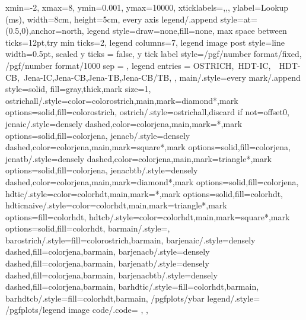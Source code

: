 {{      xmin=-2,
      xmax=8,
      ymin=0.001,
      ymax=10000,
      xticklabels={,,},
      ylabel={Lookup (ms)},
      width=8cm,
      height=5cm,
      every axis legend/.append style={at={(0.5,0)},anchor=north},
      legend style={draw=none,fill=none},
      max space between ticks=12pt,try min ticks=2,
      legend columns=7,
      legend image post style={line width=0.5pt},
      scaled y ticks = false,
      y tick label style={/pgf/number format/fixed, /pgf/number format/1000 sep = \thinspace},
      legend entries = {OSTRICH,\ HDT-IC,\ \ HDT-CB,\ Jena-IC,Jena-CB,Jena-TB,Jena-CB/TB,}
  },
  main/.style={every mark/.append style={solid, fill=gray},thick,mark size=1},
  ostrichall/.style={color=colorostrich,main,mark=diamond*,mark options={solid,fill=colorostrich}},
  ostrich/.style={ostrichall,discard if not={offset}{0}},
  jenaic/.style={densely dashed,color=colorjena,main,mark=*,mark options={solid,fill=colorjena}},
  jenacb/.style={densely dashed,color=colorjena,main,mark=square*,mark options={solid,fill=colorjena}},
  jenatb/.style={densely dashed,color=colorjena,main,mark=triangle*,mark options={solid,fill=colorjena}},
  jenacbtb/.style={densely dashed,color=colorjena,main,mark=diamond*,mark options={solid,fill=colorjena}},
  hdtic/.style={color=colorhdt,main,mark=*,mark options={solid,fill=colorhdt}},
  hdticnaive/.style={color=colorhdt,main,mark=triangle*,mark options={fill=colorhdt}},
  hdtcb/.style={color=colorhdt,main,mark=square*,mark options={solid,fill=colorhdt}},
  barmain/.style={},
  barostrich/.style={fill=colorostrich,barmain},
  barjenaic/.style={densely dashed,fill=colorjena,barmain},
  barjenacb/.style={densely dashed,fill=colorjena,barmain},
  barjenatb/.style={densely dashed,fill=colorjena,barmain},
  barjenacbtb/.style={densely dashed,fill=colorjena,barmain},
  barhdtic/.style={fill=colorhdt,barmain},
  barhdtcb/.style={fill=colorhdt,barmain},
  /pgfplots/ybar legend/.style={
      /pgfplots/legend image code/.code={%
         },
  },
}

